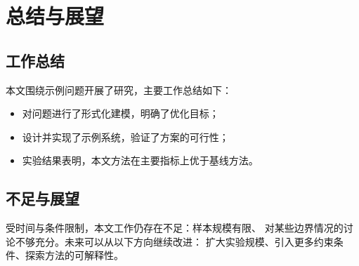 \chapter{总结与展望}

\section{工作总结}
本文围绕示例问题开展了研究，主要工作总结如下：
\begin{itemize}
  \item 对问题进行了形式化建模，明确了优化目标；
  \item 设计并实现了示例系统，验证了方案的可行性；
  \item 实验结果表明，本文方法在主要指标上优于基线方法。
\end{itemize}

\section{不足与展望}
受时间与条件限制，本文工作仍存在不足：样本规模有限、
对某些边界情况的讨论不够充分。未来可以从以下方向继续改进：
扩大实验规模、引入更多约束条件、探索方法的可解释性。
